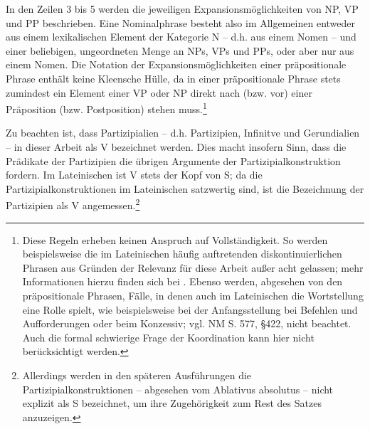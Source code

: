 \documentclass[12pt,a4paper]{article}
\begin{document}
In den Zeilen 3 bis 5 werden die jeweiligen Expansionsmöglichkeiten von NP, VP und PP beschrieben. Eine Nominalphrase besteht also im Allgemeinen entweder aus einem lexikalischen Element der Kategorie N – d.h. aus einem Nomen -- und einer beliebigen, ungeordneten Menge an NPs, VPs und PPs, oder aber nur aus einem Nomen.  Die Notation der Expansionsmöglichkeiten einer präpositionale Phrase enthält keine Kleensche Hülle, da in einer präpositionale Phrase stets zumindest ein Element einer VP oder NP direkt nach (bzw. vor) einer Präposition (bzw. Postposition) stehen muss.\footnote{Diese Regeln erheben keinen Anspruch auf Vollständigkeit. So werden beispielsweise die im Lateinischen häufig auftretenden diskontinuierlichen Phrasen aus Gründen der Relevanz für diese Arbeit außer acht gelassen; mehr Informationen hierzu finden sich bei \cite{Snijders}. Ebenso werden, abgesehen von den präpositionale Phrasen, Fälle, in denen auch im Lateinischen die Wortstellung eine Rolle spielt, wie beispielsweise bei der Anfangsstellung bei Befehlen und Aufforderungen oder beim Konzessiv; vgl. NM S. 577, §422, nicht beachtet. Auch die formal schwierige Frage der Koordination kann hier nicht berücksichtigt werden.}

Zu beachten ist, dass Partizipialien – d.h. Partizipien, Infinitve und Gerundialien -- in dieser Arbeit als V bezeichnet werden. Dies macht insofern Sinn, dass die Prädikate der Partizipien die übrigen Argumente der Partizipialkonstruktion fordern. Im Lateinischen ist V stets der Kopf von S; da die Partizipialkonstruktionen im Lateinischen satzwertig sind, ist die Bezeichnung der Partizipien als V angemessen.\footnote{Allerdings werden in den späteren Ausführungen die Partizipialkonstruktionen -- abgesehen vom Ablativus absolutus -- nicht explizit als S bezeichnet, um ihre Zugehörigkeit zum Rest des Satzes anzuzeigen.}\\
\end{document}
